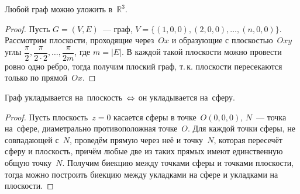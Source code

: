\begin{theorem}
Любой граф можно уложить в~$\mathbb R^3$.
\end{theorem}
\begin{proof}
Пусть $G = (V, E)$~--- граф, $V = \{ (1, 0, 0), (2, 0, 0), \ldots, (n, 0, 0) \}$.
Рассмотрим плоскости, проходящие через~$Ox$ и образующие с плоскостью~$Oxy$ углы
$\dfrac\pi2, \dfrac\pi{2\cdot2}, \ldots, \dfrac\pi{2m}$, где $m = |E|$.
В каждой такой плоскости можно провести ровно одно ребро, тогда получим плоский граф, т.\,к. плоскости пересекаются только по прямой~$Ox$.
\end{proof}
\begin{wrapfigure}{r}{0pt}\noindent
{}
\end{wrapfigure}
\begin{theorem}
Граф укладывается на~плоскость~$\opbr\Leftrightarrow \hspace{0.4pt}$ он укладывается на~сферу.
\end{theorem}
\begin{proof}
Пусть плоскость~$z = 0$ касается сферы в точке~$O(0, 0, 0)$, $N$~--- точка на~сфере, диаметрально противоположная точке~$O$.
Для каждой точки сферы, не совпадающей с~$N$, проведём прямую через неё и точку~$N$, которая пересечёт сферу и плоскость, причём любые две из таких прямых имеют единственную общую точку~$N$.
Получим биекцию между точками сферы и точками плоскости, тогда можно построить биекцию между укладками на сфере и укладками на плоскости.
\end{proof}

